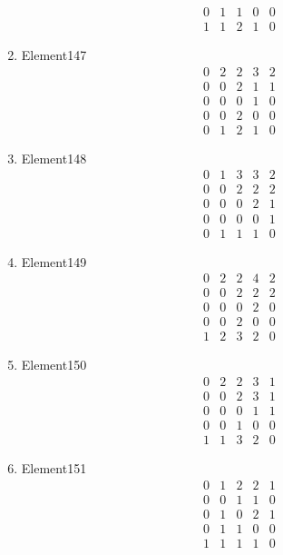 \documentclass[12pt]{article}
\begin{document}
\begin{multicols}{3}
\begin{enumerate}
\begin{equation*}
\begin{array}{ccccc}
0&1&1&0&0\\
1&1&2&1&0
\end{array}
\end{equation*}
\item Element147
\begin{equation*}
\begin{array}{ccccc}
0&2&2&3&2\\
0&0&2&1&1\\
0&0&0&1&0\\
0&0&2&0&0\\
0&1&2&1&0
\end{array}
\end{equation*}
\item Element148
\begin{equation*}
\begin{array}{ccccc}
0&1&3&3&2\\
0&0&2&2&2\\
0&0&0&2&1\\
0&0&0&0&1\\
0&1&1&1&0
\end{array}
\end{equation*}
\item Element149
\begin{equation*}
\begin{array}{ccccc}
0&2&2&4&2\\
0&0&2&2&2\\
0&0&0&2&0\\
0&0&2&0&0\\
1&2&3&2&0
\end{array}
\end{equation*}
\item Element150
\begin{equation*}
\begin{array}{ccccc}
0&2&2&3&1\\
0&0&2&3&1\\
0&0&0&1&1\\
0&0&1&0&0\\
1&1&3&2&0
\end{array}
\end{equation*}
\item Element151
\begin{equation*}
\begin{array}{ccccc}
0&1&2&2&1\\
0&0&1&1&0\\
0&1&0&2&1\\
0&1&1&0&0\\
1&1&1&1&0
\end{array}

\end{equation*}
\end{enumerate}
\end{multicols}
\end{document}
